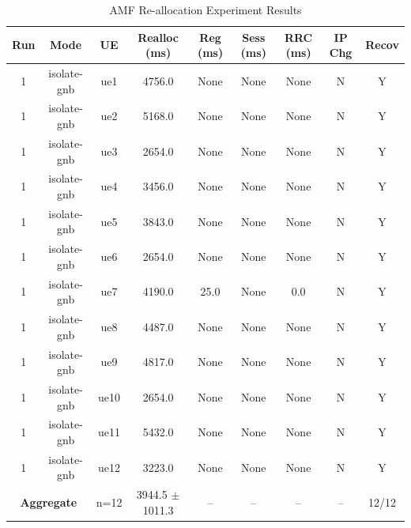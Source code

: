 \begin{table}[ht]
\centering
\begin{tabular}{|c|c|c|c|c|c|c|c|c|}
\hline
Run & Mode & UE & Realloc (ms) & Reg (ms) & Sess (ms) & RRC (ms) & IP Chg & Recov \\
\hline
1 & isolate-gnb & ue1 & 4756.0 & None & None & None & N & Y \\
1 & isolate-gnb & ue2 & 5168.0 & None & None & None & N & Y \\
1 & isolate-gnb & ue3 & 2654.0 & None & None & None & N & Y \\
1 & isolate-gnb & ue4 & 3456.0 & None & None & None & N & Y \\
1 & isolate-gnb & ue5 & 3843.0 & None & None & None & N & Y \\
1 & isolate-gnb & ue6 & 2654.0 & None & None & None & N & Y \\
1 & isolate-gnb & ue7 & 4190.0 & 25.0 & None & 0.0 & N & Y \\
1 & isolate-gnb & ue8 & 4487.0 & None & None & None & N & Y \\
1 & isolate-gnb & ue9 & 4817.0 & None & None & None & N & Y \\
1 & isolate-gnb & ue10 & 2654.0 & None & None & None & N & Y \\
1 & isolate-gnb & ue11 & 5432.0 & None & None & None & N & Y \\
1 & isolate-gnb & ue12 & 3223.0 & None & None & None & N & Y \\
\multicolumn{2}{|c|}{\textbf{Aggregate}} & n=12 & 3944.5 $\pm$ 1011.3 & -- & -- & -- & -- & 12/12 \\
\hline
\end{tabular}
\caption{AMF Re-allocation Experiment Results}
\label{tab:amf_realloc}
\end{table}
